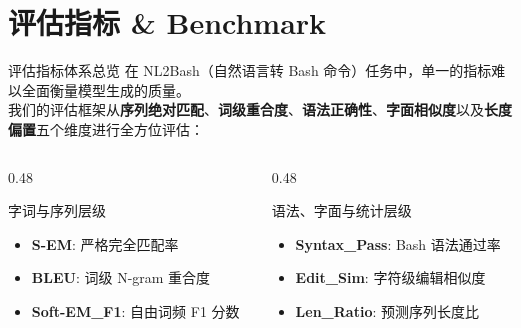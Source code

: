 \documentclass[aspectratio=169]{beamer}
\begin{document}
\section{评估指标 \& Benchmark}

\begin{frame}{评估指标体系总览}
    在 NL2Bash（自然语言转 Bash 命令）任务中，单一的指标难以全面衡量模型生成的质量。\\
    我们的评估框架从\textbf{序列绝对匹配}、\textbf{词级重合度}、\textbf{语法正确性}、\textbf{字面相似度}以及\textbf{长度偏置}五个维度进行全方位评估：
    
    \vspace{0.3cm}
    \begin{columns}[T]
        \begin{column}{0.48\textwidth}
            \begin{block}{字词与序列层级}
                \begin{itemize}
                    \item \textbf{S-EM}: 严格完全匹配率
                    \item \textbf{BLEU}: 词级 N-gram 重合度
                    \item \textbf{Soft-EM\_F1}: 自由词频 F1 分数
                \end{itemize}
            \end{block}
        \end{column}
        \begin{column}{0.48\textwidth}
            \begin{block}{语法、字面与统计层级}
                \begin{itemize}
                    \item \textbf{Syntax\_Pass}: Bash 语法通过率
                    \item \textbf{Edit\_Sim}: 字符级编辑相似度
                    \item \textbf{Len\_Ratio}: 预测序列长度比
                \end{itemize}
            \end{block}
        \end{column}
    \end{columns}
\end{frame}
\end{document}
